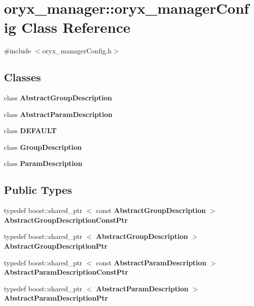 \section{oryx\-\_\-manager\-:\-:oryx\-\_\-manager\-Config \-Class \-Reference}
\label{classoryx__manager_1_1oryx__managerConfig}


{\ttfamily \#include $<$oryx\-\_\-manager\-Config.\-h$>$}

\subsection*{\-Classes}
\begin{DoxyCompactItemize}
\item 
class {\bf \-Abstract\-Group\-Description}
\item 
class {\bf \-Abstract\-Param\-Description}
\item 
class {\bf \-D\-E\-F\-A\-U\-L\-T}
\item 
class {\bf \-Group\-Description}
\item 
class {\bf \-Param\-Description}
\end{DoxyCompactItemize}
\subsection*{\-Public \-Types}
\begin{DoxyCompactItemize}
\item 
typedef boost\-::shared\-\_\-ptr\*
$<$ const \*
{\bf \-Abstract\-Group\-Description} $>$ {\bf \-Abstract\-Group\-Description\-Const\-Ptr}
\item 
typedef boost\-::shared\-\_\-ptr\*
$<$ {\bf \-Abstract\-Group\-Description} $>$ {\bf \-Abstract\-Group\-Description\-Ptr}
\item 
typedef boost\-::shared\-\_\-ptr\*
$<$ const \*
{\bf \-Abstract\-Param\-Description} $>$ {\bf \-Abstract\-Param\-Description\-Const\-Ptr}
\item 
typedef boost\-::shared\-\_\-ptr\*
$<$ {\bf \-Abstract\-Param\-Description} $>$ {\bf \-Abstract\-Param\-Description\-Ptr}
\end{DoxyCompactItemize}

